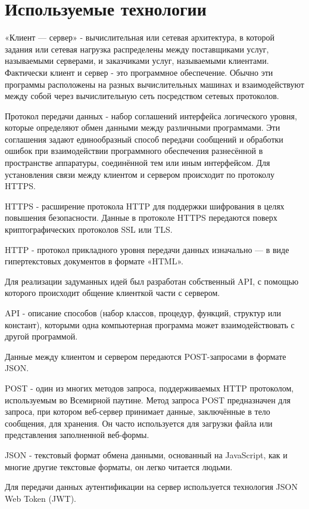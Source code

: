 \documentclass[14pt, a4paper]{extarticle}
\begin{document}
    \clearpage
    \section{Используемые технологии}
    «Клиент — сервер» - вычислительная или сетевая архитектура, в которой задания или сетевая нагрузка распределены между поставщиками услуг, называемыми серверами, и заказчиками услуг, называемыми клиентами. Фактически клиент и сервер - это программное обеспечение. Обычно эти программы расположены на разных вычислительных машинах и взаимодействуют между собой через вычислительную сеть посредством сетевых протоколов.

    Протокол передачи данных - набор соглашений интерфейса логического уровня, которые определяют обмен данными между различными программами. Эти соглашения задают единообразный способ передачи сообщений и обработки ошибок при взаимодействии программного обеспечения разнесённой в пространстве аппаратуры, соединённой тем или иным интерфейсом. Для установления связи между клиентом и сервером происходит по протоколу HTTPS.

    HTTPS - расширение протокола HTTP для поддержки шифрования в целях повышения безопасности. Данные в протоколе HTTPS передаются поверх криптографических протоколов SSL или TLS.

    HTTP - протокол прикладного уровня передачи данных изначально — в виде гипертекстовых документов в формате «HTML».

    Для реализации задуманных идей был разработан собственный API, с помощью которого происходит общение клиенткой части с сервером.

    API - описание способов (набор классов, процедур, функций, структур или констант), которыми одна компьютерная программа может взаимодействовать с другой программой.

    Данные между клиентом и сервером передаются POST-запросами в формате JSON.

    POST - один из многих методов запроса, поддерживаемых HTTP протоколом, используемым во Всемирной паутине. Метод запроса POST предназначен для запроса, при котором веб-сервер принимает данные, заключённые в тело сообщения, для хранения. Он часто используется для загрузки файла или представления заполненной веб-формы.

    JSON - текстовый формат обмена данными, основанный на JavaScript, как и многие другие текстовые форматы, он легко читается людьми.

    Для передачи данных аутентификации на сервер используется технология JSON Web Token (JWT).
\end{document}
